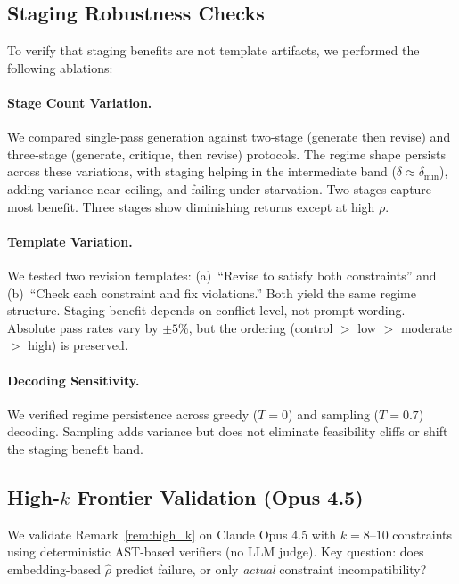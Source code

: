 \documentclass{article}
\theoremstyle{plain}
\theoremstyle{definition}
\theoremstyle{remark}
\newcommand{\rhohat}{\hat{\rho}}
\begin{document}
\subsection{Staging Robustness Checks}\label{app:staging_robustness}

To verify that staging benefits are not template artifacts, we performed the following ablations:

\paragraph{Stage Count Variation.}
We compared single-pass generation against two-stage (generate then revise) and three-stage (generate, critique, then revise) protocols.
The regime shape persists across these variations, with staging helping in the intermediate band ($\delta \approx \delta_{\min}$), adding variance near ceiling, and failing under starvation.
Two stages capture most benefit. Three stages show diminishing returns except at high $\rho$.

\paragraph{Template Variation.}
We tested two revision templates: (a)~``Revise to satisfy both constraints'' and (b)~``Check each constraint and fix violations.''
Both yield the same regime structure. Staging benefit depends on conflict level, not prompt wording.
Absolute pass rates vary by $\pm 5$\%, but the ordering (control $>$ low $>$ moderate $>$ high) is preserved.

\paragraph{Decoding Sensitivity.}
We verified regime persistence across greedy ($T{=}0$) and sampling ($T{=}0.7$) decoding.
Sampling adds variance but does not eliminate feasibility cliffs or shift the staging benefit band.

\subsection{High-$k$ Frontier Validation (Opus 4.5)}\label{app:high_k_opus}

We validate Remark~\ref{rem:high_k} on Claude Opus 4.5 with $k{=}8$--$10$ constraints using deterministic AST-based verifiers (no LLM judge). Key question: does embedding-based $\rhohat$ predict failure, or only \emph{actual} constraint incompatibility?
\end{document}
